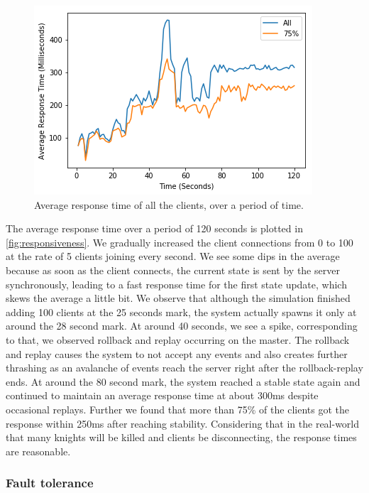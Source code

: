 \documentclass[a4paper]{IEEEtran}
\begin{document}
  \begin{figure}[bp]
    \centering
      \includegraphics[width=\columnwidth]{responsiveness}
    \caption{Average response time of all the clients, over a period of time.}
    \label{fig:responsiveness}
  \end{figure} 

  The average response time over a period of 120 seconds is plotted in \autoref{fig:responsiveness}. We gradually increased the client connections from 0 to 100 at the rate of 5 clients joining every second. We see some dips in the average because as soon as the client connects, the current state is sent by the server synchronously, leading to a fast response time for the first state update, which skews the average a little bit. We observe that although the simulation finished adding 100 clients at the 25 seconds mark, the system actually spawns it only at around the 28 second mark. At around 40 seconds, we see a spike, corresponding to that, we observed rollback and replay occurring on the master. The rollback and replay causes the system to not accept any events and also creates further thrashing as an avalanche of events reach the server right after the rollback-replay ends. At around the 80 second mark, the system reached a stable state again and continued to maintain an average response time at about 300ms despite occasional replays. Further we found that more than 75\% of the clients got the response within 250ms after reaching stability. Considering that in the real-world that many knights will be killed and clients be disconnecting, the response times are reasonable.

  \subsubsection{Fault tolerance}
\end{document}
